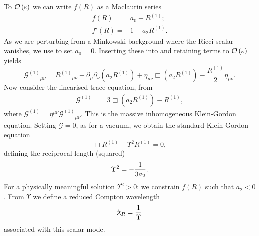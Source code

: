 To $\mathcal{O}\left({\varepsilon}\right)$ we can write $f(R)$ as a Maclaurin series
\begin{subequations}
\begin{align}
f(R) = {} & a_0 + R^{(1)}; \\
f'(R) = {} & 1 + a_2 R^{(1)}.
\end{align}
\end{subequations}
As we are perturbing from a Minkowski background where the Ricci scalar vanishes, we use  to set $a_0 = 0$. Inserting these into  and retaining terms to $\mathcal{O}\left({\varepsilon}\right)$ yields
\begin{equation}
{\mathcal{G}^{(1)}}_{\mu\nu} = {R^{(1)}}_{\mu\nu} - \partial_\mu\partial_\nu(a_2 R^{(1)}) + \eta_{\mu\nu}\Box(a_2 R^{(1)}) - \dfrac{R^{(1)}}{2}\eta_{\mu\nu}.
\label{eq:Field}
\end{equation}
Now consider the linearised trace equation, from 
\begin{align}
\mathcal{G}^{(1)} = {} & 3 \Box(a_2 R^{(1)}) - R^{(1)},
\label{eq:Box_R}
\end{align}
where $\mathcal{G}^{(1)} = \eta^{\mu\nu}{\mathcal{G}^{(1)}}_{\mu\nu}$. This is the massive inhomogeneous Klein-Gordon equation. Setting $\mathcal{G} = 0$, as for a vacuum, we obtain the standard Klein-Gordon equation
\begin{equation}
\Box R^{(1)} + \Upsilon^2 R^{(1)} = 0,
\end{equation}
defining the reciprocal length (squared)
\begin{equation}
\Upsilon^2 = -\dfrac{1}{3a_2}.
\end{equation}
For a physically meaningful solution $\Upsilon^2 > 0$: we constrain $f(R)$ such that $a_2 < 0$ \citep{Schmidt1986, Teyssandier1990, Olmo2005c, Corda2008}. From $\Upsilon$ we define a reduced Compton wavelength
\begin{equation}
\lambdabar_R = \recip{\Upsilon}
\end{equation}
associated with this scalar mode.

